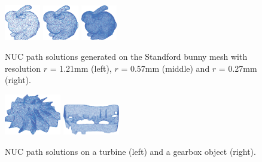\documentclass[lettersize,journal]{IEEEtran}
\begin{document}
\begin{figure}[t]
\centering
\includegraphics[width=0.14\textwidth]{figures/bunny/bunny_001}
\includegraphics[width=0.14\textwidth]{figures/bunny/bunny_0005}
\includegraphics[width=0.14\textwidth]{figures/bunny/bunny_0003}
\caption{NUC path solutions generated on the Standford bunny mesh with resolution $r$ = 1.21mm (left), $r$ = 0.57mm (middle) and $r$ = 0.27mm (right). 
}\label{fig:bunny}
\end{figure}

\begin{figure}[t]
\centering
\includegraphics[width=0.22\textwidth]{figures/simu_illustration/turbine}
\includegraphics[width=0.22\textwidth]{figures/simu_illustration/gearbox}
\caption{NUC path solutions on a turbine (left) and a gearbox object (right).}\label{fig:exp_arbitrary}
\end{figure}
\end{document}
